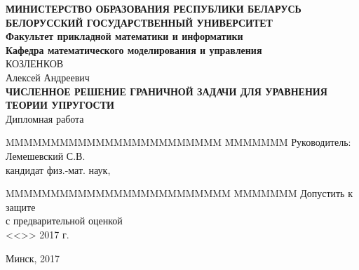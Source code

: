 \documentclass[a4paper, 14pt]{extreport}
\begin{document}
\renewcommand{\figurename}{Рисунок} %
\renewcommand{\contentsname}{\hfill\Large ОГЛАВЛЕНИЕ \hfill}
\renewcommand{\cftaftertoctitle}{\hfill}




\begin{titlepage}
    \begin{center}
        \normalsize {\bf МИНИСТЕРСТВО ОБРАЗОВАНИЯ РЕСПУБЛИКИ БЕЛАРУСЬ} \\
        \vspace{0.5cm}
        \normalsize {\bf БЕЛОРУССКИЙ ГОСУДАРСТВЕННЫЙ УНИВЕРСИТЕТ} \\
        \vspace{0.5cm}
        \normalsize {\bf Факультет прикладной математики и информатики} \\
        \vspace{0.5cm}
        \normalsize {\bf Кафедра математического моделирования и управления} \\
        \vspace{2cm}
        КОЗЛЕНКОВ \\
        Алексей Андреевич \\
        \vspace{1cm}
        \normalsize {\bf ЧИСЛЕННОЕ РЕШЕНИЕ ГРАНИЧНОЙ ЗАДАЧИ ДЛЯ УРАВНЕНИЯ ТЕОРИИ УПРУГОСТИ}\\
        \vspace{1cm}
        \normalsize Дипломная работа \\
        \vspace{2cm}
        \begin{tabbing}
            MMMMMMMMMMMMMMMMMMMMMMMM \= MMMMMMM \kill
            \> Руководитель: \\
            \> Лемешевский С.В. \\
            \>  кандидат физ.-мат. наук, 
        \end{tabbing}
        \begin{tabbing}
            MMMMMMMMMMMMMMMMMMMMMMMMM \= MMMMMMM \kill
            Допустить к защите \>  \\
            с предварительной оценкой \underline{\hspace{0.5cm}} \\
            <<\underline{\hspace{1cm}}>> \underline{\hspace{3.3cm}} 2017 г.
        \end{tabbing}

        \vspace{2cm}

        \large Минск, 2017
    \end{center}
    
\end{titlepage}
\end{document}
